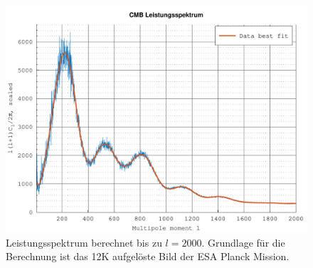 \begin{figure}
	\centering
	\includegraphics[width=\linewidth]{cmb/data/12k2500-500.pdf}
	\caption{Leistungsspektrum berechnet bis zu $l = 2000$. Grundlage für die 
	Berechnung ist das 12K aufgelöste Bild der ESA Planck Mission.}
	\label{fig:cmb-power-spec-2000}
\end{figure}
